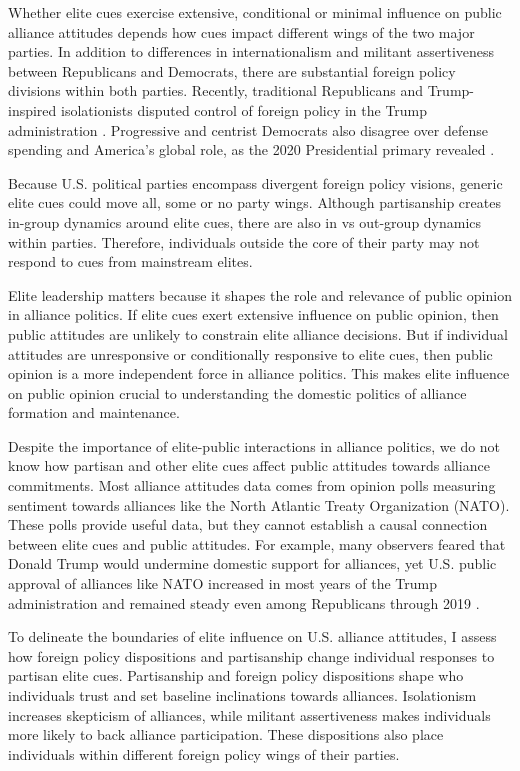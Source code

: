 \documentclass[12pt]{article}
\begin{document}
Whether elite cues exercise extensive, conditional or minimal influence on public alliance attitudes depends how cues impact different wings of the two major parties. 
In addition to differences in internationalism and militant assertiveness between Republicans and Democrats, there are substantial foreign policy divisions within both parties.
Recently, traditional Republicans and Trump-inspired isolationists disputed control of foreign policy in the Trump administration \citep{Dueck2019}.
Progressive and centrist Democrats also disagree over defense spending and America's global role, as the 2020 Presidential primary revealed \citep{Robinson2019demfp}.


Because U.S. political parties encompass divergent foreign policy visions, generic elite cues could move all, some or no party wings.
Although partisanship creates in-group dynamics around elite cues, there are also in vs out-group dynamics within parties. 
Therefore, individuals outside the core of their party may not respond to cues from mainstream elites.


Elite leadership matters because it shapes the role and relevance of public opinion in alliance politics.
If elite cues exert extensive influence on public opinion, then public attitudes are unlikely to constrain elite alliance decisions.
But if individual attitudes are unresponsive or conditionally responsive to elite cues, then public opinion is a more independent force in alliance politics. 
This makes elite influence on public opinion crucial to understanding the domestic politics of alliance formation and maintenance.  


Despite the importance of elite-public interactions in alliance politics, we do not know how partisan and other elite cues affect public attitudes towards alliance commitments. 
Most alliance attitudes data comes from opinion polls measuring sentiment towards alliances like the North Atlantic Treaty Organization (NATO).
These polls provide useful data, but they cannot establish a causal connection between elite cues and public attitudes.
For example, many observers feared that Donald Trump would undermine domestic support for alliances, yet U.S. public approval of alliances like NATO increased in most years of the Trump administration and remained steady even among Republicans through 2019 \citep{PewNATO2020}.


To delineate the boundaries of elite influence on U.S. alliance attitudes, I assess how foreign policy dispositions and partisanship change individual responses to partisan elite cues.
Partisanship and foreign policy dispositions shape who individuals trust and set baseline inclinations towards alliances. 
Isolationism increases skepticism of alliances, while militant assertiveness makes individuals more likely to back alliance participation. 
These dispositions also place individuals within different foreign policy wings of their parties. 
\end{document}
